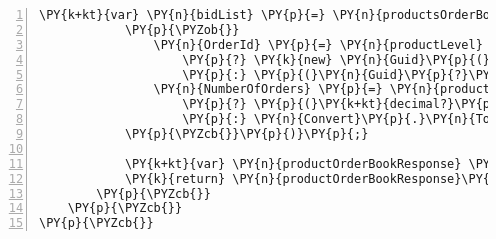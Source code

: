 \begin{Verbatim}[commandchars=\\\{\},numbers=left,firstnumber=1,stepnumber=1,numberblanklines=0]
            \PY{k+kt}{var} \PY{n}{bidList} \PY{p}{=} \PY{n}{productsOrderBookJsonResponse}\PY{p}{.}\PY{n}{Bids}\PY{p}{.}\PY{n}{Select}\PY{p}{(}\PY{n}{product} \PY{p}{=}\PY{p}{\PYZgt{}} \PY{n}{product}\PY{p}{.}\PY{n}{ToArray}\PY{p}{(}\PY{p}{)}\PY{p}{)}\PY{p}{.}\PY{n}{Select}\PY{p}{(}\PY{n}{bidArray} \PY{p}{=}\PY{p}{\PYZgt{}} \PY{k}{new} \PY{n}{Bid}\PY{p}{(}\PY{n}{Convert}\PY{p}{.}\PY{n}{ToDecimal}\PY{p}{(}\PY{n}{bidArray}\PY{p}{[}\PY{l+m}{0}\PY{p}{]}\PY{p}{,} \PY{n}{CultureInfo}\PY{p}{.}\PY{n}{InvariantCulture}\PY{p}{)}\PY{p}{,} \PY{n}{Convert}\PY{p}{.}\PY{n}{ToDecimal}\PY{p}{(}\PY{n}{bidArray}\PY{p}{[}\PY{l+m}{1}\PY{p}{]}\PY{p}{,} \PY{n}{CultureInfo}\PY{p}{.}\PY{n}{InvariantCulture}\PY{p}{)}\PY{p}{)}
            \PY{p}{\PYZob{}}
                \PY{n}{OrderId} \PY{p}{=} \PY{n}{productLevel} \PY{p}{=}\PY{p}{=} \PY{n}{ProductLevel}\PY{p}{.}\PY{n}{Three}
                    \PY{p}{?} \PY{k}{new} \PY{n}{Guid}\PY{p}{(}\PY{n}{bidArray}\PY{p}{[}\PY{l+m}{2}\PY{p}{]}\PY{p}{)}
                    \PY{p}{:} \PY{p}{(}\PY{n}{Guid}\PY{p}{?}\PY{p}{)}\PY{k}{null}\PY{p}{,}
                \PY{n}{NumberOfOrders} \PY{p}{=} \PY{n}{productLevel} \PY{p}{=}\PY{p}{=} \PY{n}{ProductLevel}\PY{p}{.}\PY{n}{Three}
                    \PY{p}{?} \PY{p}{(}\PY{k+kt}{decimal?}\PY{p}{)}\PY{k}{null}
                    \PY{p}{:} \PY{n}{Convert}\PY{p}{.}\PY{n}{ToDecimal}\PY{p}{(}\PY{n}{bidArray}\PY{p}{[}\PY{l+m}{2}\PY{p}{]}\PY{p}{,} \PY{n}{CultureInfo}\PY{p}{.}\PY{n}{InvariantCulture}\PY{p}{)}
            \PY{p}{\PYZcb{}}\PY{p}{)}\PY{p}{;}

            \PY{k+kt}{var} \PY{n}{productOrderBookResponse} \PY{p}{=} \PY{k}{new} \PY{n}{ProductsOrderBookResponse}\PY{p}{(}\PY{n}{productsOrderBookJsonResponse}\PY{p}{.}\PY{n}{Sequence}\PY{p}{,} \PY{n}{bidList}\PY{p}{,} \PY{n}{askList}\PY{p}{)}\PY{p}{;}
            \PY{k}{return} \PY{n}{productOrderBookResponse}\PY{p}{;}
        \PY{p}{\PYZcb{}}
    \PY{p}{\PYZcb{}}
\PY{p}{\PYZcb{}}
\end{Verbatim}
